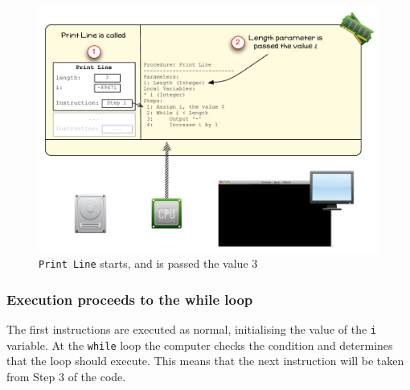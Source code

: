 \begin{figure}[htbp]
   \centering
   \includegraphics[width=\textwidth]{./topics/control-flow/images/PrintLine1} 
   \caption{\texttt{Print Line} starts, and is passed the value 3}
   \label{fig:print-line-1}
\end{figure}


\clearpage
\subsubsection{Execution proceeds to the while loop} %
\label{ssub:execution_proceeds_to_the_while_loop}

The first instructions are executed as normal, initialising the value of the \texttt{i} variable. At the \texttt{while} loop the computer checks the condition and determines that the loop should execute. This means that the next instruction will be taken from Step 3 of the code.

